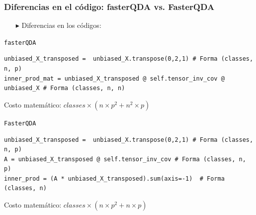 \begin{frame}[fragile]
  \frametitle{Diferencias en el código: fasterQDA vs. FasterQDA}
  \begin{itemize}
    \item[$\blacktriangleright$] Diferencias en los códigos:
  \end{itemize}

  \begin{block}{\texttt{fasterQDA}}
    \begin{lstlisting}[style=pythonstyle]
unbiased_X_transposed =  unbiased_X.transpose(0,2,1) # Forma (classes, n, p)
inner_prod_mat = unbiased_X_transposed @ self.tensor_inv_cov @ unbiased_X # Forma (classes, n, n)
    \end{lstlisting}
  \end{block}
  Costo matemático: \(classes \times (n \times p^2 + n^2 \times p)\)

  \begin{block}{\texttt{FasterQDA}}
    \begin{lstlisting}[style=pythonstyle]
unbiased_X_transposed =  unbiased_X.transpose(0,2,1) # Forma (classes, n, p)
A = unbiased_X_transposed @ self.tensor_inv_cov # Forma (classes, n, p)
inner_prod = (A * unbiased_X_transposed).sum(axis=-1)  # Forma (classes, n)
    \end{lstlisting}
  \end{block}
  Costo matemático: \(classes \times (n \times p^2 + n \times p)\)

\end{frame}



